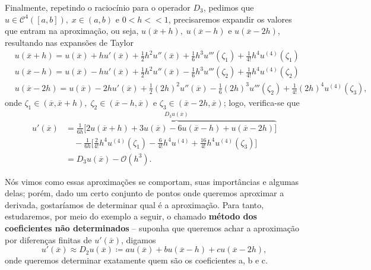 \documentclass[../differential_methods.tex]{subfiles}
\begin{document}
\begin{example}[Operador \(D_{3}\)]
	Finalmente, repetindo o raciocínio para o operador \(D_{3}\), pedimos que \(u\in \mathcal{C}^{4}([a, b]),\; x\in (a, b)\) e \(0<h<<1\), precisaremos expandir os valores que entram na aproximação, ou seja, \(u(\overline{x}+h),\; u(\overline{x}-h)\) e \(u(\overline{x}-2h)\), resultando nas expansões de Taylor
	\begin{align*}
		 & u(\overline{x}+h)=u(\overline{x})+hu'(\overline{x})+\frac{1}{2}h^{2}u''(\overline{x})+\frac{1}{6}h^{3}u'''(\zeta_{1}) + \frac{1}{4!}h^{4}u^{(4)}(\zeta_{1})            \\
		 & u(\overline{x}-h)=u(\overline{x})-hu'(\overline{x})+\frac{1}{2}h^{2}u''(\overline{x})-\frac{1}{6}h^{3}u'''(\zeta_{2}) + \frac{1}{4!}h^{4}u^{(4)}(\zeta_{2})            \\
		 & u(\overline{x}-2h)=u(\overline{x})-2hu'(\overline{x})+\frac{1}{2}(2h)^{2}u''(\overline{x})-\frac{1}{6}(2h)^{3}u'''(\zeta_{2})+ \frac{1}{4!}(2h)^{4}u^{(4)}(\zeta_{3}),
	\end{align*}
	onde \(\zeta_{1}\in (\overline{x}, \overline{x}+h),\; \zeta_{2}\in (\overline{x}-h, \overline{x})\) e \(\zeta_{3}\in (\overline{x}-2h, \overline{x})\); logo, verifica-se que
	\begin{align*}
		u'(\overline{x}) & = \overbrace{\frac{1}{6h}\biggl[2u(\overline{x}+h) + 3u(\overline{x})-6u(\overline{x}-h)+u(\overline{x}-2h)\biggr]}^{D_{3}u(\overline{x})} \\
		                 & \quad - \frac{1}{6h}\biggl[\frac{2}{4!}h^{4}u^{(4)}(\zeta_{1})-\frac{6}{4!}h^{4}u^{(4)}+\frac{16}{4!}h^{4}u^{(4)}(\zeta_{3})\biggr]        \\
		                 & =D_{3}u(\overline{x})-\mathcal{O}(h^{3}).
	\end{align*}
\end{example}

Nós vimos como essas aproximações se comportam, suas importâncias e algumas delas; porém, dado um certo conjunto de pontos onde queremos aproximar a derivada, gostaríamos de determinar qual é a aproximação.
Para tanto, estudaremos, por meio do exemplo a seguir, o chamado \textbf{método dos coeficientes não determinados} -- suponha que queremos achar a aproximação por diferenças finitas de \(u'(\overline{x})\), digamos
\[
	u'(\overline{x})\approx D_{2}u(\overline{x}) \coloneqq au(\overline{x}) +bu(\overline{x}-h)+ cu(\overline{x}-2h),
\]
onde queremos determinar exatamente quem são os coeficientes a, b e c.
\end{document}
